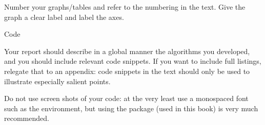 Number your graphs/tables and refer to the numbering in the text.
Give the graph a clear label and label the axes.

 {Code}

Your report should describe in a global manner the algorithms you
developed, and you should include relevant code snippets. If you want
to include full listings, relegate that to an appendix:
code snippets in the text
should only be used to illustrate especially salient points.

Do not use screen shots of your code: at the very least use a
monospaced font such as the  environment,
but using the  package
(used in this book)
is very much recommended.




